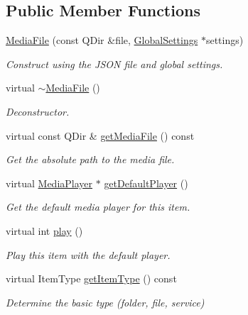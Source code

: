 \subsection*{Public Member Functions}
\begin{DoxyCompactItemize}
\item 
\hyperlink{class_a_w_e_1_1_media_file_a5f2846d619a877248cd5321f6aedbbe7}{Media\-File} (const Q\-Dir \&file, \hyperlink{class_a_w_e_1_1_global_settings}{Global\-Settings} $\ast$settings)
\begin{DoxyCompactList}\small\item\em Construct using the J\-S\-O\-N file and global settings. \end{DoxyCompactList}\item 
\hypertarget{class_a_w_e_1_1_media_file_a0ce25306ecf5a24c21dc3540d6293566}{virtual \hyperlink{class_a_w_e_1_1_media_file_a0ce25306ecf5a24c21dc3540d6293566}{$\sim$\-Media\-File} ()}\label{class_a_w_e_1_1_media_file_a0ce25306ecf5a24c21dc3540d6293566}

\begin{DoxyCompactList}\small\item\em Deconstructor. \end{DoxyCompactList}\item 
virtual const Q\-Dir \& \hyperlink{class_a_w_e_1_1_media_file_a396e8707196bed507be77d5871f3b98d}{get\-Media\-File} () const 
\begin{DoxyCompactList}\small\item\em Get the absolute path to the media file. \end{DoxyCompactList}\item 
virtual \hyperlink{class_a_w_e_1_1_media_player}{Media\-Player} $\ast$ \hyperlink{class_a_w_e_1_1_media_file_a721cb652605a6cbc17a42899d9909079}{get\-Default\-Player} ()
\begin{DoxyCompactList}\small\item\em Get the default media player for this item. \end{DoxyCompactList}\item 
virtual int \hyperlink{class_a_w_e_1_1_media_file_a04870b77386642ea6568918f8d2693a2}{play} ()
\begin{DoxyCompactList}\small\item\em Play this item with the default player. \end{DoxyCompactList}\item 
virtual Item\-Type \hyperlink{class_a_w_e_1_1_media_file_a135ea553d8a72ec3c87b75281768ca69}{get\-Item\-Type} () const 
\begin{DoxyCompactList}\small\item\em Determine the basic type (folder, file, service) \end{DoxyCompactList}\end{DoxyCompactItemize}
